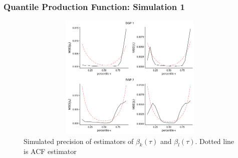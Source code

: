 \documentclass{beamer}
\begin{document}
\begin{frame}
\frametitle{Quantile Production Function: Simulation 1}
\begin{figure}[H]
\centering
\caption{Simulated precision of estimators of $\beta_{k}(\tau)$ and $\beta_{l}(\tau)$. Dotted line is ACF estimator}
\includegraphics[width=12cm, height=6cm, keepaspectratio]{ACF_MSE_Plot.png}
\end{figure}
\end{frame}

\end{document}
